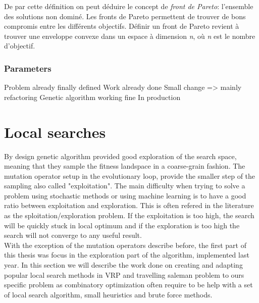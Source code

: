 \documentclass[12pt]{memoir}
\begin{document}

De par cette définition on peut déduire le concept de \emph{front de
Pareto}: l'ensemble des solutions non dominé. Les fronts de Pareto
permettent de trouver de bons compromis entre les différents objectifs.
Définir un front de Pareto revient à trouver une enveloppe convexe\cite{godfrey2007algorithms} dans
un espace à dimension \textit{n}, où \textit{n} est le nombre d'objectif.

\label{par:Multi-objective selection }

\subsubsection{Parameters} %
\label{ssub:Parameter}

Problem already finally defined 
Work already done
Small change => mainly refactoring
Genetic algorithm working fine 
In production

\section{Local searches}
By design genetic algorithm provided good exploration of the search space, meaning that they sample the fitness landspace in a coarse-grain fashion.
The mutation operator setup in the evolutionary loop, provide the smaller step of the sampling also called "exploitation". The main difficulty when trying to 
solve a problem using stochastic methods or using machine learning is to have a good ratio between exploitation and exploration. This is often refered in the literature as the sploitation/exploration problem. If the exploitation is too high, the search will be quickly stuck in local optimum and if the exploration is too high the search will not converge to any useful result. \\
With the exception of the mutation operators describe before, the first part of this thesis was focus in the exploration part of the algorithm, implemented last year. In this section we will describe the work done on creating and adapting popular local search methods in VRP and travelling saleman problem to ours specific problem as combinatory optimization often require to be help with a set of local search algorithm, small heuristics and brute force methods.
\end{document}
